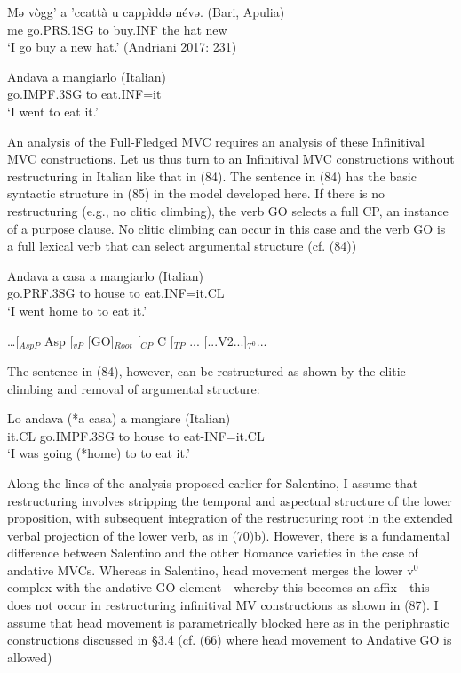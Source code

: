 \documentclass[output=paper,colorlinks,citecolor=brown,
]{langscibook}
\begin{document}
\ea \gll Mə  vògg’    a  ’ccattà  u  cappìddə  névə.   \hfill (Bari, Apulia)\\
   me  go.PRS.1SG to  buy.INF  the  hat    new {}\\
   \glt ‘I go buy a new hat.’ \hfill (Andriani 2017: 231)
\z

\ea \gll Andava      a     mangiarlo      \hfill (Italian)\\
     go.IMPF.3SG   to    eat.INF=it {}\\
    \glt ‘I went to eat it.’ 
\z

An analysis of the Full-Fledged MVC requires an analysis of these Infinitival MVC constructions. Let us thus turn to an Infinitival MVC constructions without restructuring in Italian like that in (84).  The sentence in (84) has the basic syntactic structure in (85) in the model developed here.  If there is no restructuring (e.g., no clitic climbing), the verb GO selects a full CP, an instance of a purpose clause. No clitic climbing can occur in this case and the verb GO is a full lexical verb that can select argumental structure (cf. (84))

\ea \gll Andava   a casa   a    mangiarlo       \hfill (Italian)\\
    go.PRF.3SG to house  to   eat.INF=it.CL\\
    \glt ‘I went home to to eat it.’
\z

\ea …[$_{AspP}$ Asp [$_{vP}$ [GO]$_{Root}$ [$_{CP}$ C [$_{TP}$ ... [...V2...]$_{T^0}$...
\z

The sentence in (84), however, can be restructured as shown by the clitic climbing and removal of argumental structure:

\ea \gll Lo   andava    (*a casa) a mangiare  \hfill    (Italian)\\
    it.CL go.IMPF.3SG  to house to  eat-INF=it.CL\\
    \glt ‘I was going  (*home) to to eat it.’
\z

     
    
Along the lines of the analysis proposed earlier for Salentino, I assume that restructuring involves stripping the temporal and aspectual structure of the lower proposition, with subsequent integration of the restructuring root in the extended verbal projection of the lower verb, as in (70)b).  However, there is a fundamental difference between Salentino and the other Romance varieties in the case of andative MVCs.  Whereas in Salentino, head movement merges the lower v$^0$ complex with the andative GO element—whereby this becomes an affix—this does not occur in restructuring infinitival MV constructions as shown in (87).  I assume that head movement is parametrically blocked here as in the periphrastic constructions discussed in §3.4 (cf. (66) where head movement to Andative GO is allowed)
\end{document}
